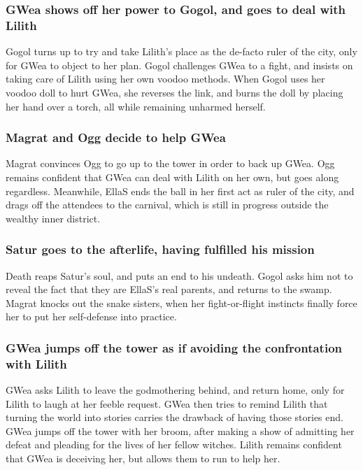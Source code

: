 \subsubsection{\Gls{GWea} shows off her power to \Gls{Gogol}, and goes to deal with \Gls{Lilith}}
\Gls{Gogol} turns up to try and take \Gls{Lilith}'s place as the de-facto ruler of the city, only
for \Gls{GWea} to object to her plan. \Gls{Gogol} challenges \Gls{GWea} to a fight, and insists on
taking care of \Gls{Lilith} using her own voodoo methods. When \Gls{Gogol} uses her voodoo doll to
hurt \Gls{GWea}, she reverses the link, and burns the doll by placing her hand over a torch, all
while remaining unharmed herself.

\subsubsection{\Gls{Magrat} and \Gls{Ogg} decide to help \Gls{GWea}}
\Gls{Magrat} convinces \Gls{Ogg} to go up to the tower in order to back up \Gls{GWea}. \Gls{Ogg}
remains confident that \Gls{GWea} can deal with \Gls{Lilith} on her own, but goes along regardless.
Meanwhile, \Gls{EllaS} ends the ball in her first act as ruler of the city, and drags off the
attendees to the carnival, which is still in progress outside the wealthy inner district.

\subsubsection{\Gls{Satur} goes to the afterlife, having fulfilled his mission}
\Gls{Death} reaps \Gls{Satur}'s soul, and puts an end to his undeath. \Gls{Gogol} asks him not to
reveal the fact that they are \Gls{EllaS}'s real parents, and returns to the swamp. \Gls{Magrat}
knocks out the snake sisters, when her fight-or-flight instincts finally force her to put her
self-defense into practice.

\subsubsection{\Gls{GWea} jumps off the tower as if avoiding the confrontation with \Gls{Lilith}}
\Gls{GWea} asks \Gls{Lilith} to leave the godmothering behind, and return home, only for
\Gls{Lilith} to laugh at her feeble request. \Gls{GWea} then tries to remind \Gls{Lilith} that
turning the world into stories carries the drawback of having those stories end. \Gls{GWea} jumps
off the tower with her broom, after making a show of admitting her defeat and pleading for the lives
of her fellow witches. \Gls{Lilith} remains confident that \Gls{GWea} is deceiving her, but allows
them to run to help her.

